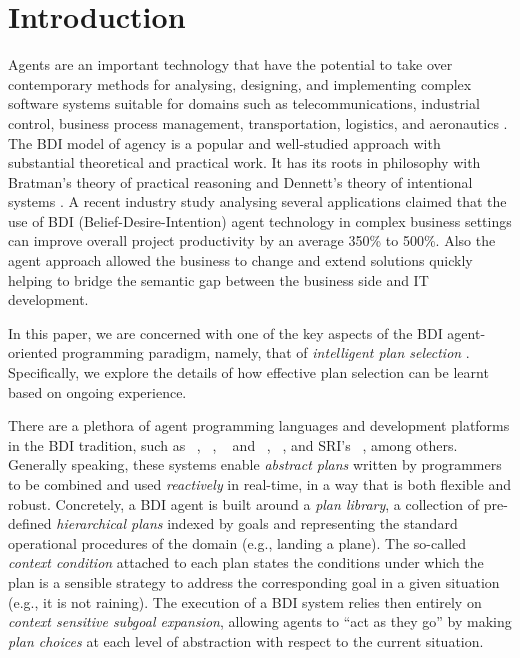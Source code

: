 \section{Introduction}\label{sec:intro}

Agents are an important technology that have the potential to take over
contemporary methods for analysing, designing, and implementing complex software
systems suitable for domains such as telecommunications, industrial control,
business process management, transportation, logistics, and aeronautics
\cite{Jennings:COMACM01,Belecheanu:AAMAS06,Ljungberg:PRICAI92-OASIS,Ziming:AAC07}.
The BDI model of agency \cite{Pollack:AIJ92-IRMA,Bratman88} is a popular and
well-studied approach with substantial theoretical and practical work. It has its
roots in philosophy with Bratman's \cite{Bratman87:Intentions} theory of practical
reasoning and Dennett's theory of intentional systems \cite{Dennet97:IntentionalStance}.
A recent industry study \cite{Benfield:AAMAS06} analysing several applications
claimed that the use of BDI (Belief-Desire-Intention) agent technology in complex
business settings can improve overall project productivity by an average 350\% to
500\%. Also the agent approach allowed the business to change and extend
solutions quickly helping to bridge the semantic gap between the business side
and IT development.




In this paper, we are concerned with one of the key aspects of the BDI
agent-oriented programming paradigm, namely, that of \emph{intelligent plan
selection} \cite{Pollack92-IRMA,Georgeff89-PRS}.
Specifically, we explore the details of how effective plan selection can be
learnt based on ongoing experience.


There are a plethora of agent programming languages and development platforms in
the BDI tradition, such as  \PRS\ \cite{Georgeff89-PRS},
\JACK~\cite{BusettaRHL:AL99-JACK}, \TAPL~\cite{Hindriks99:Agent} and
\DAPL~\cite{Dastani:JAAMAS08-2APL}, \JASON~\cite{jasonbook}, and SRI's
\SPARK~\cite{MorelyM:AAMAS04-SPARK}, among others. %
Generally speaking, these systems enable \emph{abstract plans} written by
programmers to be combined and used \emph{reactively} in real-time, in a way that
is both flexible and robust. Concretely, a BDI agent is built around a
\textit{plan library}, a collection of pre-defined \textit{hierarchical plans}
indexed by goals and representing the standard operational procedures of the
domain (e.g., landing a plane).
The so-called \emph{context condition} attached to each plan states the
conditions under which the plan is a sensible strategy to address the
corresponding goal in a given situation (e.g., it is not raining). The execution
of a BDI system relies then entirely on \textit{context sensitive subgoal
expansion}, allowing agents to ``act as they go'' by making \emph{plan choices}
at each level of abstraction with respect to the current situation.



